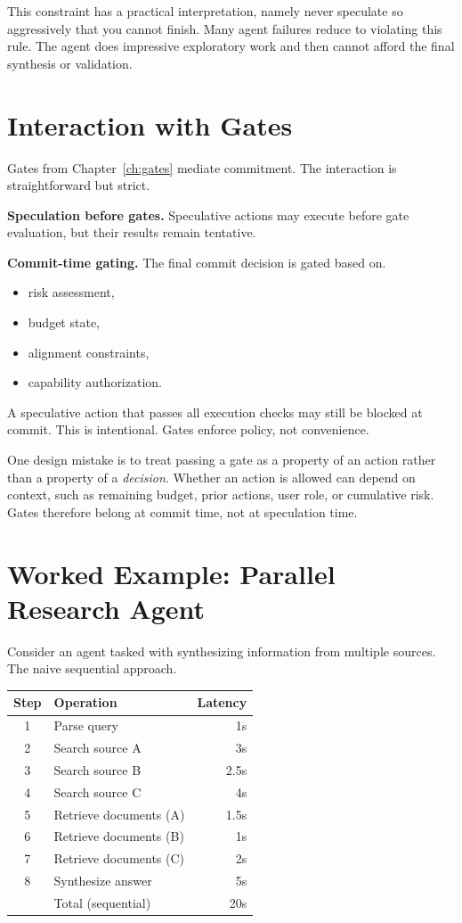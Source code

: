 This constraint has a practical interpretation, namely never speculate so aggressively that you cannot finish. Many agent failures reduce to violating this rule. The agent does impressive exploratory work and then cannot afford the final synthesis or validation.

\section{Interaction with Gates}

Gates from Chapter~\ref{ch:gates} mediate commitment. The interaction is straightforward but strict.

\textbf{Speculation before gates.} Speculative actions may execute before gate evaluation, but their results remain tentative.

\textbf{Commit-time gating.} The final commit decision is gated based on.
\begin{itemize}
\item risk assessment,
\item budget state,
\item alignment constraints,
\item capability authorization.
\end{itemize}

A speculative action that passes all execution checks may still be blocked at commit. This is intentional. Gates enforce policy, not convenience.

One design mistake is to treat passing a gate as a property of an action rather than a property of a \emph{decision}. Whether an action is allowed can depend on context, such as remaining budget, prior actions, user role, or cumulative risk. Gates therefore belong at commit time, not at speculation time.

\section{Worked Example: Parallel Research Agent}

Consider an agent tasked with synthesizing information from multiple sources. The naive sequential approach.

\begin{center}
\begin{tabular}{clr}
\toprule
Step & Operation & Latency \\
\midrule
1 & Parse query & 1s \\
2 & Search source A & 3s \\
3 & Search source B & 2.5s \\
4 & Search source C & 4s \\
5 & Retrieve documents (A) & 1.5s \\
6 & Retrieve documents (B) & 1s \\
7 & Retrieve documents (C) & 2s \\
8 & Synthesize answer & 5s \\
\midrule
& Total (sequential) & 20s \\
\bottomrule
\end{tabular}
\end{center}

